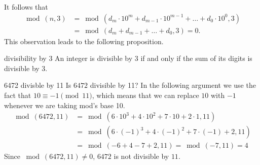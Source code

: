 It follows that 
\begin{align*}
\bmod(n,3)&=\bmod(d_m\cdot 10^m+d_{m-1}\cdot 10^{m-1}+\dots +d_{0}\cdot 10^0,3) \\
&=\bmod(d_{m}+d_{m-1}+\dots+d_{0},3)=0.
\end{align*} 
This observation leads to the following proposition.

\begin{prop}{divisibility by 3}
An integer is divisible by 3 if and only if the sum of its digits is divisible by 3.
\end{prop}

\begin{example}{6472 divisble by 11}
Is $6472$ divisible by 11? In the following argument we use the fact that $10 \equiv-1\pmod{11}$, which means that we can replace $10$ with $-1$ whenever we are taking mod's base 10.
\begin{align*}
\bmod(6472,11)&=\bmod(6\cdot 10^{3}+4\cdot 10^{2}+7\cdot 10+2\cdot 1,11) \\
&=\bmod(6\cdot (-1)^{3}+4\cdot (-1)^{2} + 7\cdot (-1) + 2,11)\\
&=\bmod(-6+4-7+2,11)=\bmod(-7,11)=4
\end{align*}
Since $\bmod(6472,11)\neq 0$, $6472$ is not divisible by $11$.
\end{example}

